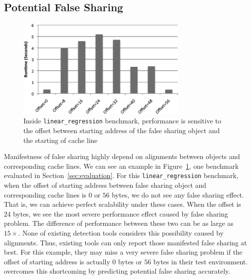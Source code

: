 \label{sec:prediction}

\subsection{Potential False Sharing}

\begin{figure}[!h]
\begin{center}
\includegraphics[width=3.3in]{fig/perfsensitive}
\end{center}
\caption{
Inside \texttt{linear\_regression} benchmark,
performance is sensitive to the offset between starting address of the false sharing object 
and the starting of cache line 
\label{fig:perfsensitive}}
\end{figure}

Manifestness of false sharing highly depend on 
alignments between objects and corresponding cache lines.
We can see an example in Figure~\ref{fig:perfsensitive}, one benchmark evaluated in
Section~\ref{sec:evaluation}. 
For this \texttt{linear\_regression} benchmark,
when the offset of starting address between false sharing object and corresponding cache lines 
is $0$ or $56$ bytes, 
we do not see any false sharing effect. That is, we can achieve perfect scalability under
these cases.  
When the offset is $24$ bytes, we see the most severe performance effect caused 
by false sharing problem. 
The difference of performance between these two can be as large as $15\times$.
None of existing detection tools considers this possibility caused by alignments. 
Thus, existing tools can only report those manifested false sharing at best. 
For this example, they may miss a very severe false sharing problem if the offset of starting 
address is actually $0$ bytes or $56$ bytes in their test environment.
 overcomes this shortcoming by predicting potential false sharing accurately. 

